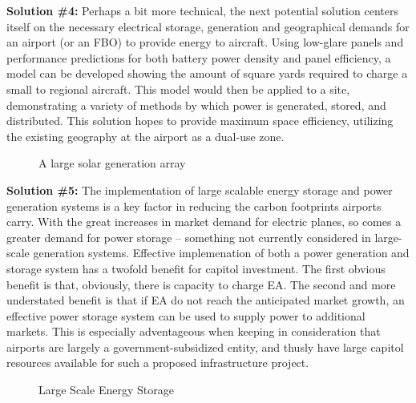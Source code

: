 \documentclass[../main.tex]{subfiles}
\begin{document}
\newpage
\noindent\textbf{Solution \#4:}\newline
\indent Perhaps a bit more technical, the next potential solution centers itself on the necessary electrical storage, generation and geographical demands for an airport (or an FBO) to provide energy to aircraft. Using low-glare panels and performance predictions for both battery power density and panel efficiency, a model can be developed showing the amount of square yards required to charge a small to regional aircraft. This model would then be applied to a site, demonstrating a variety of methods by which power is generated, stored, and distributed. This solution hopes to provide maximum space efficiency, utilizing the existing geography at the airport as a dual-use zone.\par
\begin{figure}[h!]
    \centering
    \caption{A large solar generation array}
    \centering
\end{figure}

\newpage
\noindent\textbf{Solution \#5:}\newline
\indent The implementation of large scalable energy storage and power generation systems is a key factor in reducing the carbon footprints airports carry. With the great increases in market demand for electric planes, so comes a greater demand for power storage -- something not currently considered in large-scale generation systems. Effective implemenation of both a power generation and storage system has a twofold benefit for capitol investment. The first obvious benefit is that, obviously, there is capacity to charge EA. The second and more understated benefit is that if EA do not reach the anticipated market growth, an effective power storage system can be used to supply power to additional markets. This is especially adventageous when keeping in consideration that airports are largely a government-subsidized entity, and thusly have large capitol resources available for such a proposed infrastructure project.
\begin{figure}[h!]
    \centering
    \caption{Large Scale Energy Storage}
    \centering
\end{figure}
\end{document}
